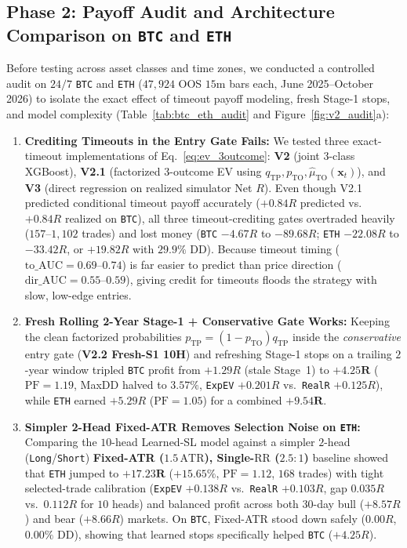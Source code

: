 \documentclass{article}
\newcommand{\RR}{\mathrm{RR}}
\newcommand{\TP}{\mathrm{TP}}
\newcommand{\ATR}{\mathrm{ATR}}
\newcommand{\PF}{\mathrm{PF}}
\begin{document}
\subsection{Phase 2: Payoff Audit and Architecture Comparison on \texttt{BTC} and \texttt{ETH}}
\label{sec:audit}

Before testing across asset classes and time zones, we conducted a controlled audit on $24/7$ \texttt{BTC} and \texttt{ETH} ($47{,}924$ OOS $15\text{m}$ bars each, June 2025--October 2026) to isolate the exact effect of timeout payoff modeling, fresh Stage-1 stops, and model complexity (Table~\ref{tab:btc_eth_audit} and Figure~\ref{fig:v2_audit}a):

\begin{enumerate}
    \item \textbf{Crediting Timeouts in the Entry Gate Fails:} We tested three exact-timeout implementations of Eq.~\eqref{eq:ev_3outcome}: \textbf{V2} (joint 3-class XGBoost), \textbf{V2.1} (factorized 3-outcome EV using $q_{\TP}, p_{\mathrm{TO}}, \widehat{\mu}_{\mathrm{TO}}(\mathbf{x}_t)$), and \textbf{V3} (direct regression on realized simulator Net $R$). Even though V2.1 predicted conditional timeout payoff accurately ($+0.84R$ predicted vs.\ $+0.84R$ realized on \texttt{BTC}), all three timeout-crediting gates overtraded heavily ($157$--$1{,}102$ trades) and lost money (\texttt{BTC} $-4.67R$ to $-89.68R$; \texttt{ETH} $-22.08R$ to $-33.42R$, or $+19.82R$ with $29.9\%$ DD). Because timeout timing ($\mathrm{to\_AUC} = 0.69$--$0.74$) is far easier to predict than price direction ($\mathrm{dir\_AUC} = 0.55$--$0.59$), giving credit for timeouts floods the strategy with slow, low-edge entries.
    \item \textbf{Fresh Rolling 2-Year Stage-1 + Conservative Gate Works:} Keeping the clean factorized probabilities $p_{\TP} = (1 - p_{\mathrm{TO}}) q_{\TP}$ inside the \emph{conservative} entry gate (\textbf{V2.2 Fresh-S1 10H}) and refreshing Stage-1 stops on a trailing $2$-year window tripled \texttt{BTC} profit from $+1.29R$ (stale Stage~1) to $\mathbf{+4.25R}$ ($\PF = 1.19$, MaxDD halved to $\mathbf{3.57\%}$, \texttt{ExpEV} $+0.201R$ vs.\ \texttt{RealR} $+0.125R$), while \texttt{ETH} earned $+5.29R$ ($\PF = 1.05$) for a combined $\mathbf{+9.54R}$.
    \item \textbf{Simpler 2-Head Fixed-ATR Removes Selection Noise on \texttt{ETH}:} Comparing the $10$-head Learned-SL model against a simpler $2$-head (\texttt{Long}/\texttt{Short}) \textbf{Fixed-ATR ($1.5\,\ATR$), Single-$\RR$ ($2.5{:}1$)} baseline showed that \texttt{ETH} jumped to $\mathbf{+17.23R}$ ($+15.65\%$, $\PF = 1.12$, $168$ trades) with tight selected-trade calibration (\texttt{ExpEV} $+0.138R$ vs.\ \texttt{RealR} $+0.103R$, gap $0.035R$ vs.\ $0.112R$ for $10$ heads) and balanced profit across both $30$-day bull ($+8.57R$) and bear ($+8.66R$) markets. On \texttt{BTC}, Fixed-ATR stood down safely ($0.00R$, $0.00\%$ DD), showing that learned stops specifically helped \texttt{BTC} ($+4.25R$).
\end{enumerate}
\end{document}
